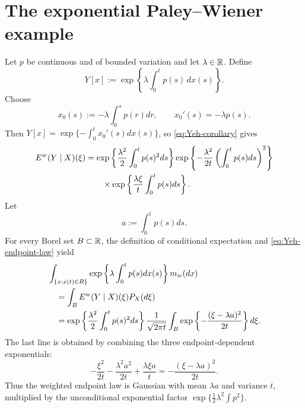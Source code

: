 \section{The exponential Paley--Wiener example}
Let $p$ be continuous and of bounded variation and let $\lambda\in\mathbb{R}$.  Define
\begin{equation}\label{eq:Yeh-example-Y}
 Y[x]
 :=\exp\left\{\lambda\int_0^tp(s)\,dx(s)\right\}.
\end{equation}
Choose
\begin{equation}\label{eq:Yeh-example-x0}
 x_0(s):=-\lambda\int_0^sp(r)dr,
 \qquad
 x_0'(s)=-\lambda p(s).
\end{equation}
Then $Y[x]=\exp\{-\int_0^tx_0'(s)dx(s)\}$, so \eqref{eq:Yeh-corollary} gives
\begin{align}
 E^w(Y\mid X)(\xi)
 &=\exp\left\{\frac{\lambda^2}{2}\int_0^tp(s)^2ds\right\}
 \exp\left\{-\frac{\lambda^2}{2t}
 \left(\int_0^tp(s)ds\right)^2\right\}\notag\\
 &\qquad\times
 \exp\left\{\frac{\lambda\xi}{t}\int_0^tp(s)ds\right\}.
 \label{eq:Yeh-example-conditional}
\end{align}
Let
\[
 a:=\int_0^tp(s)ds.
\]
For every Borel set $B\subset\mathbb{R}$, the definition of conditional expectation and \eqref{eq:Yeh-endpoint-law} yield
\begin{align}
 &\int_{\{x:x(t)\in B\}}
 \exp\left\{\lambda\int_0^tp(s)dx(s)\right\}m_w(dx)\notag\\
 &\quad=\int_BE^w(Y\mid X)(\xi)P_X(d\xi)\notag\\
 &\quad=\exp\left\{\frac{\lambda^2}{2}\int_0^tp(s)^2ds\right\}
 \frac1{\sqrt{2\pi t}}
 \int_B\exp\left\{-\frac{(\xi-\lambda a)^2}{2t}\right\}d\xi.
 \label{eq:Yeh-final-integral}
\end{align}
The last line is obtained by combining the three endpoint-dependent exponentials:
\[
 -\frac{\xi^2}{2t}
 -\frac{\lambda^2a^2}{2t}
 +\frac{\lambda\xi a}{t}
 =-\frac{(\xi-\lambda a)^2}{2t}.
\]
Thus the weighted endpoint law is Gaussian with mean $\lambda a$ and variance $t$, multiplied by the unconditional exponential factor $\exp\{\frac12\lambda^2\int p^2\}$.

